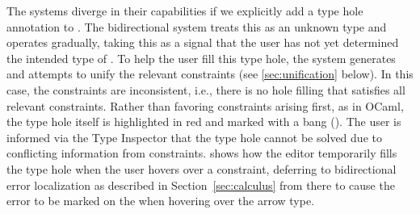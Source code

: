 

The systems diverge in their capabilities if we explicitly add a type hole annotation to . The
bidirectional system treats this as an unknown type and operates gradually, taking this as a signal
that the user has not yet determined the intended type of . To help the user fill this type
hole, the system generates and attempts to unify the relevant constraints (see
\cref{sec:unification} below). In this case, the constraints are inconsistent, i.e., there is no hole filling that satisfies all relevant constraints. Rather than favoring constraints arising first, as in OCaml, the type hole itself is highlighted in red and marked with a bang (\li{!}). The user is informed via the Type Inspector that the type hole cannot be solved due to conflicting information from constraints.  shows how the editor temporarily fills the type hole when the user hovers over a constraint, deferring to bidirectional error localization as described in Section~\ref{sec:calculus} from there to cause the error to be marked on the  when hovering over the arrow type.

